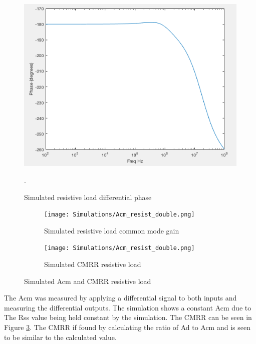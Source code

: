 \begin{figure}[H]
	\begin{center}
		\includegraphics[scale=.30]{Simulations/phasefirststage.png}
		\caption{Simulated resistive load differential phase}
		\label{fig:firststagephase}.
	\end{center}
\end{figure}




\begin{figure}[H]
    \begin{subfigure}[b]{0.45\textwidth}
    \centering
    \texttt{[image: Simulations/Acm\_resist\_double.png]}
    \caption{Simulated resistive load common mode gain}
    \label{fig:acmresistsim}
\end{subfigure}
    \hfill
     \begin{subfigure}[b]{0.45\textwidth}
    \centering
    \texttt{[image: Simulations/Acm\_resist\_double.png]}
    \caption{Simulated CMRR resistive load}
    \label{fig:cmrrsimres}
\end{subfigure}
    \caption{Simulated Acm and CMRR resistive load}
    \label{fig:acmcmrrsim}
\end{figure} 

The Acm was measured by applying a differential signal to both inputs and measuring the differential outputs.
The simulation shows a constant Acm due to The Rss value being held constant by the simulation. The CMRR can be seen in Figure \ref{fig:cmrrsimres}. The CMRR if found by calculating the ratio of Ad to Acm and is seen to be similar to the calculated value.


